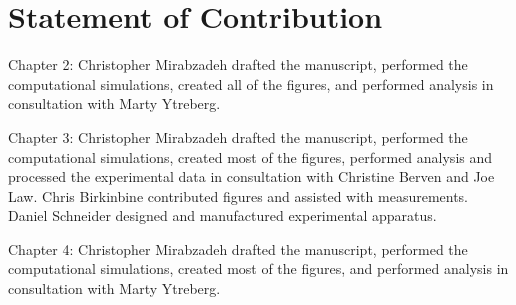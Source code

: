 
\section*{\large{Statement of Contribution}}

\begin{flushleft}
Chapter 2: Christopher Mirabzadeh drafted the manuscript, performed the computational simulations, created all of the figures, and performed analysis in consultation with Marty Ytreberg.

Chapter 3: Christopher Mirabzadeh drafted the manuscript, performed the computational simulations, created most of the figures, performed analysis and processed the experimental data in consultation with Christine Berven and Joe Law. Chris Birkinbine contributed figures and assisted with measurements. Daniel Schneider designed and manufactured  experimental apparatus. 

Chapter 4: Christopher Mirabzadeh drafted the manuscript, performed the computational simulations, created most of the figures, and performed analysis in consultation with Marty Ytreberg.

\end{flushleft}